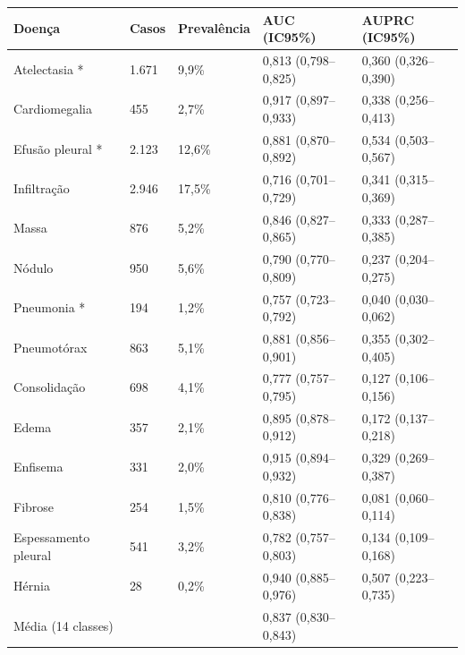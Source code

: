 \begin{tabular}{lllll}
\toprule
Doença & Casos & Prevalência & AUC (IC95\%) & AUPRC (IC95\%) \\
\midrule
Atelectasia * & 1.671 & 9,9\% & 0,813 (0,798–0,825) & 0,360 (0,326–0,390) \\
Cardiomegalia & 455 & 2,7\% & 0,917 (0,897–0,933) & 0,338 (0,256–0,413) \\
Efusão pleural * & 2.123 & 12,6\% & 0,881 (0,870–0,892) & 0,534 (0,503–0,567) \\
Infiltração & 2.946 & 17,5\% & 0,716 (0,701–0,729) & 0,341 (0,315–0,369) \\
Massa & 876 & 5,2\% & 0,846 (0,827–0,865) & 0,333 (0,287–0,385) \\
Nódulo & 950 & 5,6\% & 0,790 (0,770–0,809) & 0,237 (0,204–0,275) \\
Pneumonia * & 194 & 1,2\% & 0,757 (0,723–0,792) & 0,040 (0,030–0,062) \\
Pneumotórax & 863 & 5,1\% & 0,881 (0,856–0,901) & 0,355 (0,302–0,405) \\
Consolidação & 698 & 4,1\% & 0,777 (0,757–0,795) & 0,127 (0,106–0,156) \\
Edema & 357 & 2,1\% & 0,895 (0,878–0,912) & 0,172 (0,137–0,218) \\
Enfisema & 331 & 2,0\% & 0,915 (0,894–0,932) & 0,329 (0,269–0,387) \\
Fibrose & 254 & 1,5\% & 0,810 (0,776–0,838) & 0,081 (0,060–0,114) \\
Espessamento pleural & 541 & 3,2\% & 0,782 (0,757–0,803) & 0,134 (0,109–0,168) \\
Hérnia & 28 & 0,2\% & 0,940 (0,885–0,976) & 0,507 (0,223–0,735) \\
Média (14 classes) &  &  & 0,837 (0,830–0,843) &  \\
\bottomrule
\end{tabular}
